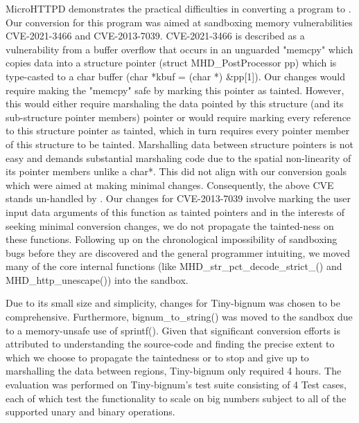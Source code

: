 MicroHTTPD demonstrates the practical difficulties in converting a program to \systemname. Our conversion for this program was aimed at sandboxing memory vulnerabilities CVE-2021-3466 and CVE-2013-7039. CVE-2021-3466 is described as a vulnerability from a buffer overflow that occurs in an unguarded "memcpy" which copies data into a structure pointer (struct MHD\_PostProcessor pp) which is type-casted to a char buffer (char *kbuf = (char *) \&pp[1]). Our changes would require making the "memcpy" safe by marking this pointer as tainted. However, this would either require marshaling the data pointed by this structure (and its sub-structure pointer members) pointer or would require marking every reference to this structure pointer as tainted, which in turn requires every pointer member of this structure to be tainted. Marshalling data between structure pointers is not easy and demands substantial marshaling code due to the spatial non-linearity of its pointer members unlike a char*. This did not align with our conversion goals which were aimed at making minimal changes. Consequently, the above CVE stands un-handled by \systemname.  Our changes for CVE-2013-7039 involve marking the user input data arguments of this function as tainted pointers and in the interests of seeking minimal conversion changes, we do not propagate the tainted-ness on these functions. Following up on the chronological impossibility of sandboxing bugs before they are discovered and the general programmer intuiting, we moved many of the core internal functions (like MHD\_str\_pct\_decode\_strict\_() and MHD\_http\_unescape()) into the sandbox. 

Due to its small size and simplicity, \systemname changes for Tiny-bignum was chosen to be comprehensive. Furthermore, bignum\_to\_string() was moved to the sandbox due to a memory-unsafe use of sprintf(). Given that significant \systemname conversion efforts is attributed to understanding the source-code and finding the precise extent to which we choose to propagate the taintedness or to stop and give up to marshalling the data between regions, Tiny-bignum only required 4 hours. The evaluation was performed on Tiny-bignum's test suite consisting of 4 Test cases, each of which test the functionality to scale on big numbers subject to all of the supported unary and binary operations.  





